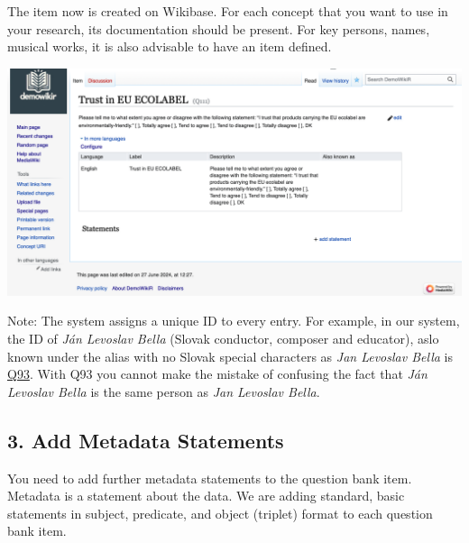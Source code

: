 \documentclass[
  letterpaper,
  DIV=11,
  numbers=noendperiod]{scrreprt}
\begin{document}
The item now is created on Wikibase. For each concept that you want to
use in your research, its documentation should be present. For key
persons, names, musical works, it is also advisable to have an item
defined.

\begin{center}
\includegraphics{png/question_to_wikibase/example_question_2x1.png}
\end{center}

\begin{tcolorbox}[enhanced jigsaw, opacityback=0, bottomrule=.15mm, rightrule=.15mm, toptitle=1mm, breakable, colbacktitle=quarto-callout-note-color!10!white, colback=white, title=\textcolor{quarto-callout-note-color}{\faInfo}\hspace{0.5em}{Note}, leftrule=.75mm, toprule=.15mm, left=2mm, arc=.35mm, colframe=quarto-callout-note-color-frame, coltitle=black, titlerule=0mm, bottomtitle=1mm, opacitybacktitle=0.6]

Note: The system assigns a unique ID to every entry. For example, in our
system, the ID of \emph{Ján Levoslav Bella} (Slovak conductor, composer
and educator), aslo known under the alias with no Slovak special
characters as \emph{Jan Levoslav Bella} is
\href{https://reprexbase.eu/demowiki/index.php?title=Item:Q93}{Q93}.
With Q93 you cannot make the mistake of confusing the fact that
\emph{Ján Levoslav Bella} is the same person as \emph{Jan Levoslav
Bella}.

\end{tcolorbox}

\subsection{3. Add Metadata Statements}\label{add-metadata-statements}

You need to add further metadata statements to the question bank item.
Metadata is a statement about the data. We are adding standard, basic
statements in subject, predicate, and object (triplet) format to each
question bank item.
\end{document}
